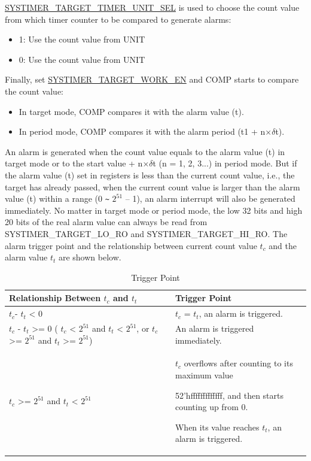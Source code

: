\documentclass[main\_\_EN.tex]{subfiles}
\begin{document}
\hyperref[fielddesc:SYSTIMERTARGET0TIMERUNITSEL]{SYSTIMER\_TARGET\_TIMER\_UNIT\_SEL} is used to choose the count value from which timer counter to be compared to generate alarms:

\begin{itemize}
        \item 1: Use the count value from UNIT
        \item 0: Use the count value from UNIT
\end{itemize}

Finally, set \hyperref[fielddesc:SYSTIMERTARGET0WORKEN]{SYSTIMER\_TARGET\_WORK\_EN} and COMP starts to compare the count value:

\begin{itemize}
        \item In target mode, COMP compares it with the alarm value (t).
        \item In period mode, COMP compares it with the alarm period (t1 + n×$\delta$t).
\end{itemize}

An alarm is generated when the count value equals to the alarm value (t) in target mode or to the start value + n×$\delta$t (n = 1, 2, 3...) in period mode. But if the alarm value (t) set in registers is less than the current count value, i.e., the target has already passed, when the current count value is larger than the alarm value (t) within a range (0 \verb+~+ $2^{51}$ – 1), an alarm interrupt will also be generated immediately. No matter in target mode or period mode, the low 32 bits and high 20 bits of the real alarm value can always be read from SYSTIMER\_TARGET\_LO\_RO and SYSTIMER\_TARGET\_HI\_RO. The alarm trigger point and the relationship between current count value $t_{c}$ and the alarm value $t_{t}$ are shown below.

\begin{longtable}[c]{ | p{5cm} | p{7.5cm} |}
\caption{Trigger Point}\\\hline
\rowcolor{lightgray}
\textbf{Relationship Between $t_{c}$ and $t_{t}$} & \textbf{Trigger Point}\\ \hline
\endhead
$t_{c}$- $t_{t}$ < 0 & $t_{c}$ = $t_{t}$, an alarm is triggered.\\ \hline
$t_{c}$ - $t_{t}$ >= 0 \newline ( $t_{c}$ < $2^{51}$ and $t_{t}$ < $2^{51}$, \newline or $t_{c}$ >= $2^{51}$ and $t_{t}$ >= $2^{51}$) & An alarm is triggered immediately. \\ \hline
\multirow{3}{*}{
$t_{c}$ >= $2^{51}$ and $t_{t}$ < $2^{51}$} &

$t_{c}$ overflows after counting to its maximum value

52'hfffffffffffff, and then starts counting up from 0.

When its value reaches $t_{t}$, an alarm is triggered. \\ \hline
\end{longtable}
\end{document}
